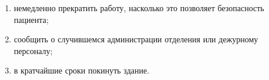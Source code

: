 \documentclass[a4paper,12pt]{extarticle}
\begin{document}
\begin{enumerate}
\begin{enumerate}
\item немедленно прекратить работу, насколько это позволяет безопасность пациента;
\item сообщить о случившемся администрации отделения или дежурному персоналу;
\item в кратчайшие сроки покинуть здание.
\end{enumerate}
                                                                                                                                                                                                                                                                                                                                                                                                                                                                                                                                                                                                                                                                                                                                                                                                                                                                                                                                                                                                                                                                                                                                                                                                                                                                                                                                                                                                                                                                                                                                                                                                                                                                                                                                                                                                                                                                                                                                                                                                                                                                                                                                                                                                                                                                                                                                                                                                                                                                                                                                                                                                                                                                                                                                                                                                                                                                                                                                                         
\end{enumerate}
\end{document}
